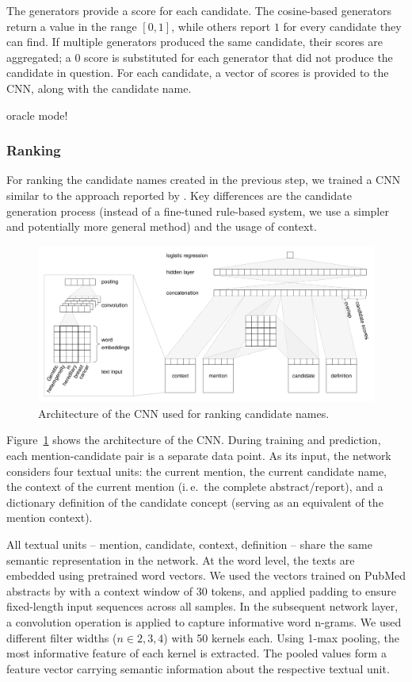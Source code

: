 \documentclass{bioinfo}
\newcommand{\ie}{i.\,e.\ }
\begin{document}
The generators provide a score for each candidate.
The cosine-based generators return a value in the range $[0,1]$, while others report $1$ for every candidate they can find.
If multiple generators produced the same candidate, their scores are aggregated; a $0$ score is substituted for each generator that did not produce the candidate in question.
For each candidate, a vector of scores is provided to the CNN, along with the candidate name.

oracle mode!

\subsubsection{Ranking}
\label{ssub:ranking}

For ranking the candidate names created in the previous step, we trained a CNN similar to the approach reported by \cite{lihaodi-et-al:2017}.
Key differences are the candidate generation process (instead of a fine-tuned rule-based system, we use a simpler and potentially more general method) and the usage of context.

\begin{figure}[!tpb]
\centerline{\includegraphics[width=\textwidth]{img/nn-arch.pdf}}
\caption{Architecture of the CNN used for ranking candidate names.}\label{fig:sys-arch}
\end{figure}

Figure~\ref{fig:sys-arch} shows the architecture of the CNN.
During training and prediction, each mention-candidate pair is a separate data point.
As its input, the network considers four textual units:
the current mention, the current candidate name, the context of the current mention (\ie the complete abstract/report), and a dictionary definition of the candidate concept (serving as an equivalent of the mention context).

All textual units -- mention, candidate, context, definition – share the same semantic representation in the network.
At the word level, the texts are embedded using pretrained word vectors.
We used the vectors trained on PubMed abstracts by \cite{chiu-et-al:2016:BioNLP} with a context window of 30 tokens, and applied padding to ensure fixed-length input sequences across all samples.
In the subsequent network layer, a convolution operation is applied to capture informative word n-grams.
We used different filter widths ($n \in {2,3,4}$) with 50 kernels each.
Using 1-max pooling, the most informative feature of each kernel is extracted.
The pooled values form a feature vector carrying semantic information about the respective textual unit.
\end{document}
